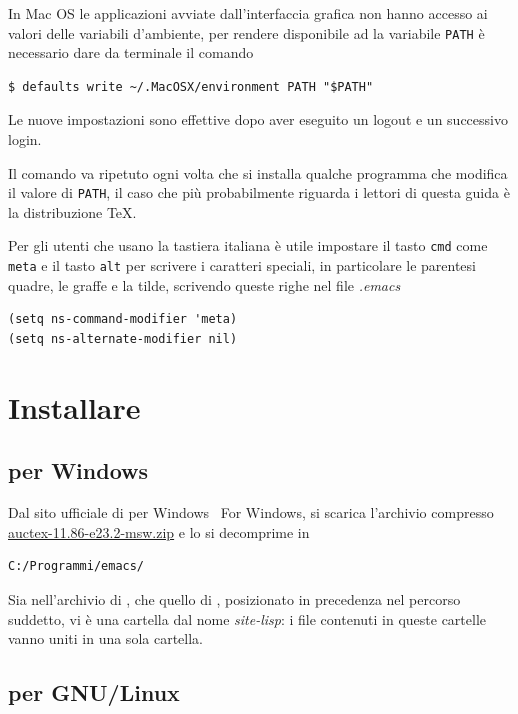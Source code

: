 \documentclass[11pt,a4paper]{article}
\begin{document}
In Mac OS le applicazioni avviate dall'interfaccia grafica non hanno
accesso ai valori delle variabili d'ambiente, per rendere disponibile
ad \emacs{} la variabile \texttt{PATH} è necessario dare da terminale
il comando
\begin{Verbatim}
$ defaults write ~/.MacOSX/environment PATH "$PATH"
\end{Verbatim}
Le nuove impostazioni sono effettive dopo aver eseguito un logout e un
successivo login.

Il comando va ripetuto ogni volta che si installa qualche programma
che modifica il valore di \texttt{PATH}, il caso che più probabilmente
riguarda i lettori di questa guida è la distribuzione \TeX{}.

Per gli utenti che usano la tastiera italiana è utile impostare il
tasto \texttt{cmd} come \texttt{meta} e il tasto \texttt{alt} per
scrivere i caratteri speciali, in particolare le parentesi quadre, le
graffe e la tilde, scrivendo queste righe nel file \emph{.emacs}
\begin{Verbatim}
(setq ns-command-modifier 'meta)
(setq ns-alternate-modifier nil)
\end{Verbatim}

\section{Installare \auctex}
\label{sec:installauc}

\subsection{\auctex{} per Windows}
\label{sec:auctexwin}

Dal sito ufficiale di \auctex{} per Windows %
%
{\auctex\ For Windows}, %
si scarica l'archivio compresso %
\href{http://ftp.gnu.org/pub/gnu/auctex/auctex-11.86-e23.2-msw.zip}%
{\textsf{auctex-11.86-e23.2-msw.zip}} e lo si decomprime in
\begin{Verbatim}
C:/Programmi/emacs/
\end{Verbatim}
Sia nell'archivio di \auctex{}, che quello di \emacs, posizionato in precedenza
nel percorso suddetto, vi è una cartella dal nome \emph{site-lisp}: i file
contenuti in queste cartelle vanno uniti in una sola cartella.

\subsection{\auctex{} per GNU/Linux}
\label{sec:auctexlinux}
\end{document}
